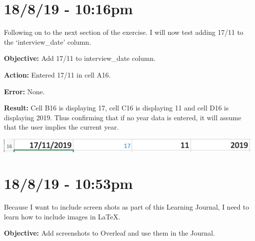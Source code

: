 \documentclass{article}
\begin{document}
\section*{18/8/19 - 10:16pm}

Following on to the next section of the exercise. I will now test adding 17/11 to the ‘interview\_date’ column.

\textbf{Objective:} Add 17/11 to interview\_date column.

\textbf{Action:} Entered 17/11 in cell A16.

\textbf{Error:} None.

\textbf{Result:} Cell B16 is displaying 17, cell C16 is displaying 11 and cell D16 is displaying 2019. Thus confirming that if no year data is entered, it will assume that the user implies the current year.

\includegraphics[width=\textwidth]{figb.png}

\section*{18/8/19 - 10:53pm}

Because I want to include screen shots as part of this Learning Journal, I need to learn how to include images in LaTeX.

\textbf{Objective:} Add screenshots to Overleaf and use them in the Journal.
\end{document}
